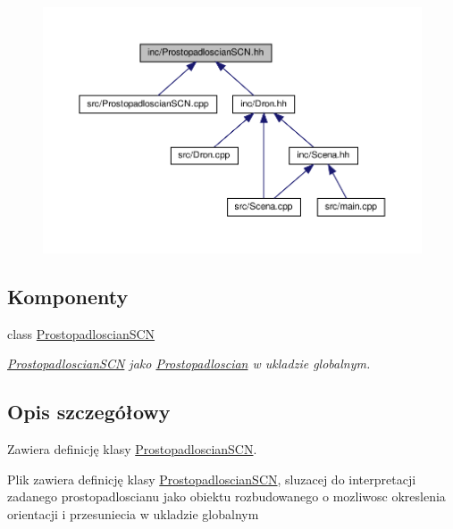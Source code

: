 \begin{figure}[H]
\begin{center}
\leavevmode
\includegraphics[width=350pt]{ProstopadloscianSCN_8hh__dep__incl}
\end{center}
\end{figure}
\subsection*{Komponenty}
\begin{DoxyCompactItemize}
\item 
class \hyperlink{classProstopadloscianSCN}{Prostopadloscian\+S\+CN}
\begin{DoxyCompactList}\small\item\em \hyperlink{classProstopadloscianSCN}{Prostopadloscian\+S\+CN} jako \hyperlink{classProstopadloscian}{Prostopadloscian} w ukladzie globalnym. \end{DoxyCompactList}\end{DoxyCompactItemize}


\subsection{Opis szczegółowy}
Zawiera definicję klasy \hyperlink{classProstopadloscianSCN}{Prostopadloscian\+S\+CN}. 

Plik zawiera definicję klasy \hyperlink{classProstopadloscianSCN}{Prostopadloscian\+S\+CN}, sluzacej do interpretacji zadanego prostopadloscianu jako obiektu rozbudowanego o mozliwosc okreslenia orientacji i przesuniecia w ukladzie globalnym 